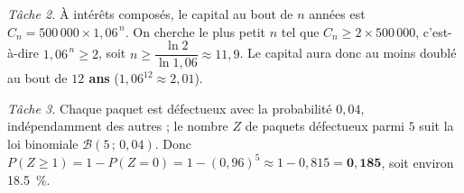 \emph{Tâche 2.} À intérêts composés, le capital au bout de $n$ années est
$C_n=500\,000\times1{,}06^{\,n}$. On cherche le plus petit $n$ tel que $C_n\ge2\times500\,000$,
c'est-à-dire $1{,}06^{\,n}\ge2$, soit $n\ge\dfrac{\ln2}{\ln1{,}06}\approx11{,}9$. Le capital
aura donc au moins doublé au bout de \textbf{$12$ ans} ($1{,}06^{12}\approx2{,}01$).

\emph{Tâche 3.} Chaque paquet est défectueux avec la probabilité $0{,}04$, indépendamment
des autres ; le nombre $Z$ de paquets défectueux parmi $5$ suit la loi binomiale
$\mathcal{B}(5\,;\,0{,}04)$. Donc
$P(Z\ge1)=1-P(Z{=}0)=1-(0{,}96)^5\approx1-0{,}815=\mathbf{0{,}185}$, soit environ \SI{18,5}{\percent}.

